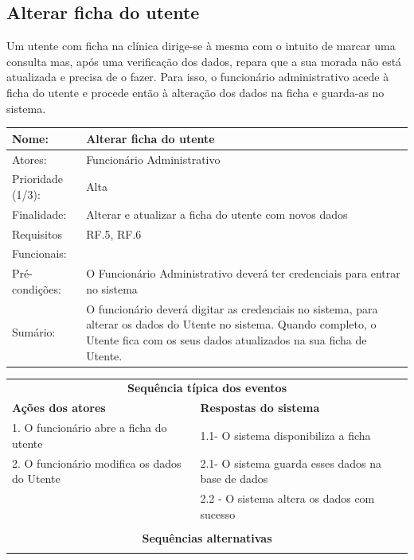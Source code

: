 \documentclass[11pt,a4paper,twoside]{report}
\begin{document}
\subsection{Alterar ficha do utente}

Um utente com ficha na clínica dirige-se à mesma com o intuito de marcar uma consulta mas, após uma verificação dos dados, repara que a sua morada não está atualizada e precisa de o fazer. Para isso, o funcionário administrativo acede à ficha do utente e procede então à alteração dos dados na ficha e guarda-as no sistema.  

\begin{center}
	\begin{tabularx}{\textwidth}{|lX|}
		\hline
		\textbf{Nome}: & \textbf{Alterar ficha do utente } \\ \hline
		Atores: & Funcionário Administrativo  \\ \hline
		Prioridade (1/3): & Alta \\ \hline
		Finalidade: & Alterar e atualizar a ficha do utente com novos dados   \\ \hline
		Requisitos & RF.5, RF.6    \\
		Funcionais: & \\
		Pré-condições: & O Funcionário Administrativo deverá ter credenciais para entrar no sistema    \\
		Sumário: & O funcionário deverá digitar as credenciais no sistema, para alterar os dados do Utente no sistema. Quando completo, o Utente fica com os seus dados atualizados na sua ficha de Utente. \\
		\hline
	\end{tabularx}
	
	\begin{tabularx}{\textwidth}{|XX|}
		\hline
		\multicolumn{2}{|c|}{\textbf{Sequência típica dos eventos} }\\
		\textbf{Ações dos atores}  & \textbf{Respostas do sistema} \\
		1.     O funcionário abre a ficha do utente    & 1.1-    O sistema disponibiliza a ficha \\
		2.     O funcionário modifica os dados do Utente    &   2.1-    O sistema guarda esses dados na base de dados  \\
		&  2.2 -     O sistema altera os dados com sucesso   \\
		&   \\
		\hline
		\multicolumn{2}{|c|}{\textbf{Sequências alternativas } }\\
		\hline
		& \\
		\hline
	\end{tabularx}
	
\end{center}
\end{document}
